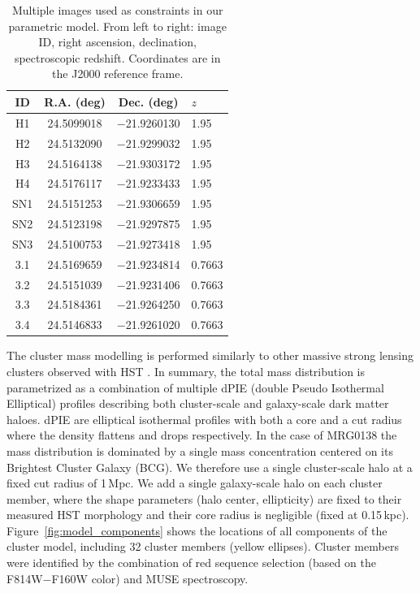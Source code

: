 \documentclass[12pt]{article}
\begin{document}
\begin{table}[ht]
    \centering
    \begin{tabular}{cccl}
     ID &   R.A. (deg) & Dec. (deg) & $z$ \\
     \midrule
H1 & 24.5099018 & $-$21.9260130 & 1.95 \\
H2 & 24.5132090 & $-$21.9299032 & 1.95 \\
H3 & 24.5164138 & $-$21.9303172 & 1.95 \\
H4 & 24.5176117 & $-$21.9233433 & 1.95 \\
     \midrule
SN1 & 24.5151253 & $-$21.9306659 & 1.95 \\
SN2 & 24.5123198 & $-$21.9297875 & 1.95 \\
SN3 & 24.5100753 & $-$21.9273418 & 1.95 \\
     \midrule
3.1 & 24.5169659 & $-$21.9234814 & 0.7663 \\
3.2 & 24.5151039 & $-$21.9231406 & 0.7663 \\
3.3 & 24.5184361 & $-$21.9264250 & 0.7663 \\
3.4 & 24.5146833 & $-$21.9261020 & 0.7663 \\
    \end{tabular}
    \caption{Multiple images used as constraints in our parametric model. From left to right: image ID, right ascension, declination, spectroscopic redshift.  Coordinates are in the J2000 reference frame.}
    \label{tab:mulimages}
\end{table}

The cluster mass modelling is performed similarly to other massive strong lensing clusters observed with HST \cite{richard_mass_2014}. In summary, the total mass distribution is parametrized as a combination of multiple dPIE (double Pseudo Isothermal Elliptical) profiles describing both cluster-scale and galaxy-scale dark matter haloes. dPIE are elliptical isothermal profiles with both a core and a cut radius where the density flattens and drops respectively. In the case of MRG0138 the mass distribution is dominated by a single mass concentration centered on its Brightest Cluster Galaxy (BCG). We therefore use a single cluster-scale halo at a fixed cut radius of 1\,Mpc.  We add a single galaxy-scale halo on each cluster member, where the shape parameters (halo center, ellipticity) are fixed to their measured HST morphology and their core radius is negligible (fixed at 0.15\,kpc). 
Figure~\ref{fig:model_components} shows the locations of all components of the cluster model, including 32 cluster members (yellow ellipses). Cluster members were identified by the combination of red sequence selection (based on the F814W$-$F160W color) and MUSE spectroscopy.
\end{document}
